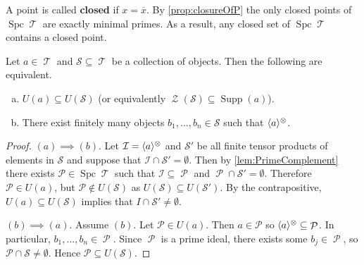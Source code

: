 \documentclass[11pt]{article}
\DeclareMathOperator{\cZ}{\mathcal{Z}}
\DeclareMathOperator{\TT}{\mathcal{T}}
\DeclareMathOperator{\cP}{\mathcal{P}}
\DeclareMathOperator{\supp}{Supp}
\DeclareMathOperator{\spc}{Spc}
\begin{document}
\begin{rmk}
A point is called \textbf{closed} if $x = \overline{x}$. By \autoref{prop:closureOfP} the only closed points of $\spc\TT$ are exactly minimal primes. As a result, any closed set of $\spc \TT$ contains a closed point. 
\end{rmk}

\begin{lem}\label{lem:ZinSuppa}
Let $a \in \TT$ and $\mathcal{S} \subseteq \TT$ be a collection of objects. Then the following are equivalent.
\begin{enumerate}[(a)]
	\item $U(a) \subseteq U(\mathcal{S})$ (or equivalently $\cZ(\mathcal{S}) \subseteq \supp(a)$).
	\item There exist finitely many objects $b_1,...,b_n \in \mathcal{S}$ such that $\langle a \rangle^{\otimes}$.
\end{enumerate}
\end{lem}
\begin{proof}
$(a) \implies (b)$. Let $\mathcal{I} = \langle a \rangle^{\otimes}$ and $\mathcal{S}'$ be all finite tensor products of elements in $\mathcal{S}$ and suppose that $\mathcal{I} \cap \mathcal{S}' = \emptyset$. Then by \autoref{lem:PrimeComplement} there exists $\mathcal{P} \in \spc \TT$ such that $\mathcal{I} \subseteq \cP$ and $\cP \cap \mathcal{S}' = \emptyset$. Therefore $\mathcal{P} \in U(a)$, but $\mathcal{P} \not\in U(\mathcal{S})$ as $U(\mathcal{S}) \subseteq U(\mathcal{S}')$. By the contrapositive, $U(a) \subseteq U(\mathcal{S})$ implies that $I \cap \mathcal{S}' \not = \emptyset$.

$(b) \implies (a)$. Assume $(b)$. Let $\mathcal{P} \in U(a)$. Then $a \in \mathcal{P}$ so $\la a \ra^{\otimes} \subseteq \cP$. In particular, $ b_1,...,b_n \in \cP$. Since $\cP$ is a prime ideal, there exists some $b_j \in \cP$, so $\mathcal{P} \cap \mathcal{S} \not = \emptyset$. Hence $\mathcal{P} \subseteq U(\mathcal{S})$. 
\end{proof}
\end{document}
